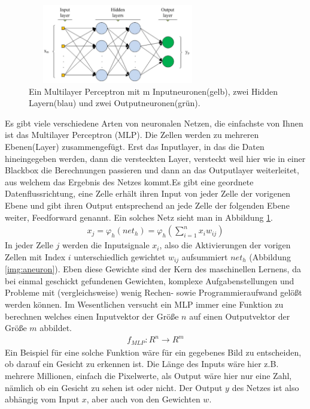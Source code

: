 \begin{figure}
	\centering
	\includegraphics[width=0.7\textwidth, height=130px]{pics/mlp.jpg}	
	\caption{Ein Multilayer Perceptron mit m Inputneuronen(gelb), zwei Hidden Layern(blau) und zwei Outputneuronen(grün).   \cite{bib:mlp}}
	\label{img:mlp}
\end{figure}
Es gibt viele verschiedene Arten von neuronalen Netzen, die einfachste von Ihnen ist das Multilayer Perceptron (MLP). Die Zellen werden zu mehreren Ebenen(Layer) zusammengefügt. Erst das Inputlayer, in das die Daten hineingegeben werden, dann die versteckten Layer, versteckt weil hier wie in einer Blackbox die Berechnungen passieren und dann an das Outputlayer weiterleitet, aus welchem das Ergebnis des Netzes kommt.Es gibt eine geordnete Datenflussrichtung, eine Zelle erhält ihren Input von jeder Zelle der vorigenen Ebene und gibt ihren Output entsprechend an jede Zelle der folgenden Ebene weiter, Feedforward genannt. Ein solches Netz sieht man in Abbildung \ref{img:mlp}.  
\begin{gather}
x_{j} = \varphi_{h}(net_{h}) = \varphi_{h}(\sum_{i=1}^{n} x_{i}w_{ij}) 
\label{eq:act}
\end{gather}
In jeder Zelle \(j\) werden die Inputsignale \(x_{i}\), also die Aktivierungen der vorigen Zellen mit Index \(i\) unterschiedlich gewichtet \(w_{ij}\) aufsummiert \(net_{h}\) (Abbildung \ref{img:aneuron}).  Eben diese Gewichte sind der Kern des maschinellen Lernens, da bei einmal geschickt gefundenen Gewichten, komplexe Aufgabenstellungen und Probleme mit (vergleichsweise) wenig Rechen- sowie Programmieraufwand gelößt werden können. Im Wesentlichen versucht ein MLP immer eine Funktion zu berechnen welches einen Inputvektor der Größe \(n\) auf einen Outputvektor der Größe \(m\) abbildet.
\begin{gather*}
f_{MLP}: R^n \to R^m 
\end{gather*}
Ein Beispiel für eine solche Funktion wäre für ein gegebenes Bild zu entscheiden, ob darauf ein Gesicht zu erkennen ist. Die Länge des Inputs wäre hier z.B. mehrere Millionen, einfach die Pixelwerte, als Output wäre hier nur eine Zahl, nämlich ob ein Gesicht zu sehen ist oder nicht. Der Output \(y\) des Netzes ist also abhängig vom Input \(x\), aber auch von den Gewichten \(w\).
